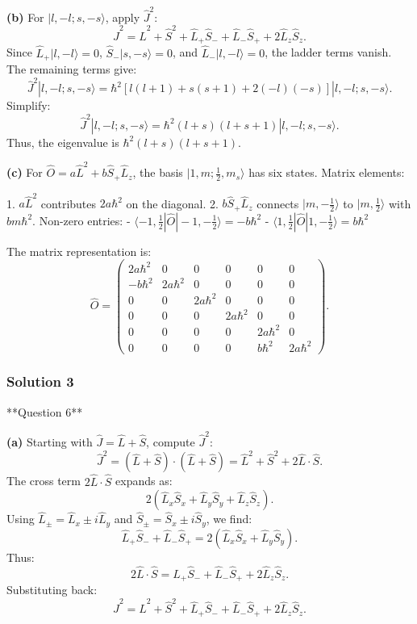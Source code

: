 \documentclass{article}
\begin{document}
\textbf{(b)} For \(|l, -l; s, -s\rangle\), apply \(\hat{J}^2\):
\[
\hat{J}^2 = \hat{L}^2 + \hat{S}^2 + \hat{L}_+ \hat{S}_- + \hat{L}_- \hat{S}_+ + 2\hat{L}_z \hat{S}_z.
\]
Since \(\hat{L}_+ |l, -l\rangle = 0\), \(\hat{S}_- |s, -s\rangle = 0\), and \(\hat{L}_- |l, -l\rangle = 0\), the ladder terms vanish. The remaining terms give:
\[
\hat{J}^2 |l, -l; s, -s\rangle = \hbar^2 \left[ l(l+1) + s(s+1) + 2(-l)(-s) \right] |l, -l; s, -s\rangle.
\]
Simplify:
\[
\hat{J}^2 |l, -l; s, -s\rangle = \hbar^2 (l + s)(l + s + 1) |l, -l; s, -s\rangle.
\]
Thus, the eigenvalue is \(\hbar^2 (l + s)(l + s + 1)\).

\textbf{(c)} For \(\hat{O} = a \hat{L}^2 + b \hat{S}_+ \hat{L}_z\), the basis \(|1, m; \frac{1}{2}, m_s\rangle\) has six states. Matrix elements:

1. \(a \hat{L}^2\) contributes \(2a\hbar^2\) on the diagonal.
2. \(b \hat{S}_+ \hat{L}_z\) connects \(|m, -\frac{1}{2}\rangle\) to \(|m, \frac{1}{2}\rangle\) with \(b m \hbar^2\). Non-zero entries:
   - \( \langle -1, \frac{1}{2} | \hat{O} | -1, -\frac{1}{2} \rangle = -b\hbar^2 \)
   - \( \langle 1, \frac{1}{2} | \hat{O} | 1, -\frac{1}{2} \rangle = b\hbar^2 \)

The matrix representation is:
\[
\hat{O} = \begin{pmatrix}
2a\hbar^2 & 0 & 0 & 0 & 0 & 0 \\
-b\hbar^2 & 2a\hbar^2 & 0 & 0 & 0 & 0 \\
0 & 0 & 2a\hbar^2 & 0 & 0 & 0 \\
0 & 0 & 0 & 2a\hbar^2 & 0 & 0 \\
0 & 0 & 0 & 0 & 2a\hbar^2 & 0 \\
0 & 0 & 0 & 0 & b\hbar^2 & 2a\hbar^2
\end{pmatrix}.
\]

\subsubsection{Solution 3}
**Question 6**

\textbf{(a)} Starting with \(\hat{J} = \hat{L} + \hat{S}\), compute \(\hat{J}^2\):
\[
\hat{J}^2 = (\hat{L} + \hat{S}) \cdot (\hat{L} + \hat{S}) = \hat{L}^2 + \hat{S}^2 + 2 \hat{L} \cdot \hat{S}.
\]
The cross term \(2 \hat{L} \cdot \hat{S}\) expands as:
\[
2 (\hat{L}_x \hat{S}_x + \hat{L}_y \hat{S}_y + \hat{L}_z \hat{S}_z).
\]
Using \(\hat{L}_\pm = \hat{L}_x \pm i\hat{L}_y\) and \(\hat{S}_\pm = \hat{S}_x \pm i\hat{S}_y\), we find:
\[
\hat{L}_+ \hat{S}_- + \hat{L}_- \hat{S}_+ = 2(\hat{L}_x \hat{S}_x + \hat{L}_y \hat{S}_y).
\]
Thus:
\[
2 \hat{L} \cdot \hat{S} = \hat{L}_+ \hat{S}_- + \hat{L}_- \hat{S}_+ + 2 \hat{L}_z \hat{S}_z.
\]
Substituting back:
\[
\hat{J}^2 = \hat{L}^2 + \hat{S}^2 + \hat{L}_+ \hat{S}_- + \hat{L}_- \hat{S}_+ + 2 \hat{L}_z \hat{S}_z.
\]
\end{document}
